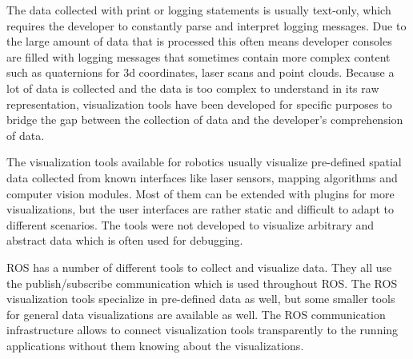 The data collected with print or logging statements is usually text-only, which requires the developer to constantly parse and interpret logging messages. Due to the large amount of data that is processed this often means developer consoles are filled with logging messages that sometimes contain more complex content such as quaternions for 3d coordinates, laser scans and point clouds. Because a lot of data is collected and the data is too complex to understand in its raw representation, visualization tools have been developed for specific purposes to bridge the gap between the collection of data and the developer's comprehension of data.

The visualization tools available for robotics usually visualize pre-defined spatial data collected from known interfaces like laser sensors, mapping algorithms and computer vision modules. Most of them can be extended with plugins for more visualizations, but the user interfaces are rather static and difficult to adapt to different scenarios. The tools were not developed to visualize arbitrary and abstract data which is often used for debugging.

ROS has a number of different tools to collect and visualize data. They all use the publish/subscribe communication which is used throughout ROS. The ROS visualization tools specialize in pre-defined data as well, but some smaller tools for general data visualizations are available as well. The ROS communication infrastructure allows to connect visualization tools transparently to the running applications without them knowing about the visualizations.

